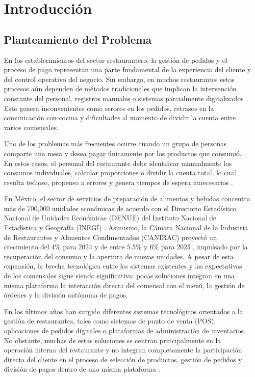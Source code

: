 \section{Introducción}

\subsection{Planteamiento del Problema}

En los establecimientos del sector restaurantero, la gesti\'on de pedidos y el proceso
de pago representan una parte fundamental de la experiencia del cliente y del control
operativo del negocio. Sin embargo, en muchos restaurantes estos procesos a\'un dependen
de m\'etodos tradicionales que implican la intervenci\'on constante del personal, registros
manuales o sistemas parcialmente digitalizados \cite{toast_success_2023, nra_state_2023}. Esto genera inconvenientes como errores
en los pedidos, retrasos en la comunicaci\'on con cocina y dificultades al momento de dividir
la cuenta entre varios comensales.

Uno de los problemas m\'as frecuentes ocurre cuando un grupo de personas comparte una
mesa y desea pagar \'unicamente por los productos que consumi\'o. En estos casos, el personal
del restaurante debe identificar manualmente los consumos individuales, calcular proporciones
o dividir la cuenta total, lo cual resulta tedioso, propenso a errores y genera tiempos de espera
innecesarios \cite{lee_digital_2024, tan_tabletop_2020}.

En M\'exico, el sector de servicios de preparaci\'on de alimentos y bebidas concentra m\'as de
700{,}000 unidades econ\'omicas de acuerdo con el Directorio Estad\'istico Nacional de Unidades
Econ\'omicas (DENUE) del Instituto Nacional de Estad\'istica y Geograf\'ia (INEGI) \cite{inegi_denue_2024}.
Asimismo, la C\'amara Nacional de la Industria de Restaurantes y Alimentos Condimentados (CANIRAC)
proyect\'o un crecimiento del 4\% para 2024 \cite{inegi_canirac_2023} y de entre 5.5\% y 6\% para 2025 \cite{ramirez_canirac_2025},
impulsado por la recuperaci\'on del consumo y la apertura de nuevas unidades.
A pesar de esta expansi\'on, la brecha tecnol\'ogica entre los sistemas existentes y las expectativas
de los comensales sigue siendo significativa: pocas soluciones integran en una misma plataforma
la interacci\'on directa del comensal con el men\'u, la gesti\'on de \'ordenes y la divisi\'on
aut\'onoma de pagos.

En los \'ultimos a\~nos han surgido diferentes sistemas tecnol\'ogicos orientados a la gesti\'on
de restaurantes, tales como sistemas de punto de venta (POS), aplicaciones de pedidos digitales
o plataformas de administraci\'on de inventarios. No obstante, muchas de estas soluciones se
centran principalmente en la operaci\'on interna del restaurante y no integran completamente
la participaci\'on directa del cliente en el proceso de selecci\'on de productos, gesti\'on de
pedidos y divisi\'on de pagos dentro de una misma plataforma \cite{katagri_smart_2025}.

